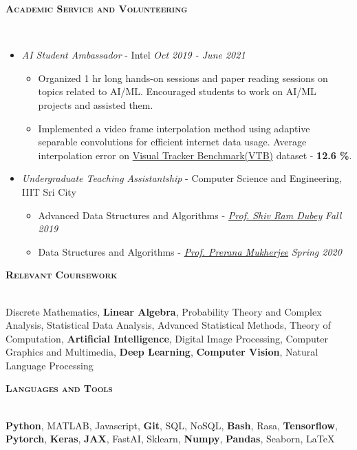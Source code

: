 \documentclass[10pt]{article}
\renewcommand{\section}[1]{
\bigskip
  \begin{Large}
  {\textsc{\textbf{#1}}}
  \end{Large}
  \hrulefill
  \medskip
  \\
}
\newenvironment{lonemidlist}[1][\enskip\textbullet]%
        {\begin{itemize}[#1,leftmargin=*,parsep=0pt,itemsep=4pt,topsep=0pt,partopsep=0pt]}
        {\end{itemize}}
\begin{document}
\section{Academic Service and Volunteering}
\vspace{-4mm}
\begin{lonemidlist}

\item \textit{AI Student Ambassador} - Intel \hfill {\textit{Oct 2019 - June 2021}}
  \begin{itemize}
        \item Organized 1 hr long hands-on sessions and paper reading sessions on topics related to AI/ML. Encouraged students to work on AI/ML projects and assisted them.
        \item Implemented a video frame interpolation method using adaptive separable convolutions for efficient internet data usage. Average interpolation error on \href{https://github.com/Debapriya-Tula/AdaConv-Pytorch}{Visual Tracker Benchmark(VTB)} dataset - \textbf{12.6 \%}.
  \end{itemize}
\item \textit{Undergraduate Teaching Assistantship} - Computer Science and Engineering, IIIT Sri City
  \begin{itemize}
        \item Advanced Data Structures and Algorithms - \href{https://profile.iiita.ac.in/srdubey/}{\textit{Prof. Shiv Ram Dubey}} \hfill{\textit{Fall 2019}}
        \item Data Structures and Algorithms - \href{https://mprerana.github.io/DrPreranaMukherjee/}{\textit{Prof. Prerana Mukherjee}} \hfill{\textit{Spring 2020}}
  \end{itemize}
\end{lonemidlist}
\vspace{1.0mm}

\section{Relevant Coursework}
Discrete Mathematics, \textbf{Linear Algebra}, Probability Theory and Complex Analysis, Statistical Data Analysis, Advanced Statistical Methods, Theory of Computation, \textbf{Artificial Intelligence}, Digital Image Processing, Computer Graphics and Multimedia, \textbf{Deep Learning}, \textbf{Computer Vision}, Natural Language Processing
\vspace{1.0mm}

\section{Languages and Tools}
\textbf{Python}, MATLAB, Javascript, \textbf{Git}, SQL, NoSQL, \textbf{Bash}, Rasa, \textbf{Tensorflow}, \textbf{Pytorch}, \textbf{Keras}, \textbf{JAX}, FastAI, Sklearn, \textbf{Numpy}, \textbf{Pandas}, Seaborn, LaTeX
\vspace{1.0mm}
\end{document}
